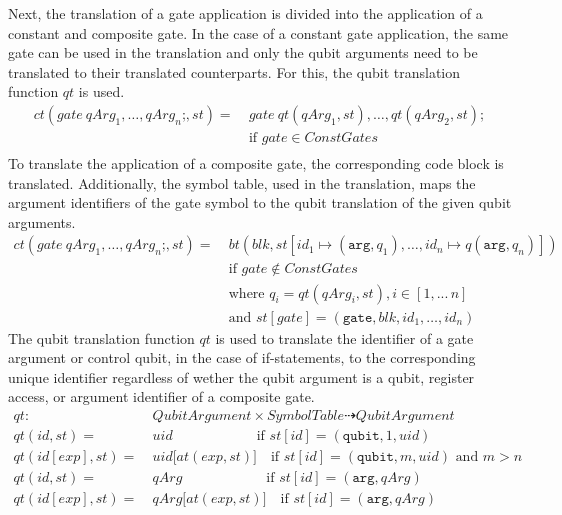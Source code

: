 Next, the translation of a gate application is divided into the application of a constant and composite gate. In the case of a constant gate application, the same gate can be used in the translation and only the qubit arguments need to be translated to their translated counterparts. For this, the qubit translation function $qt$ is used. 
\begin{align*}
    ct(gate \ qArg_1, \dots, qArg_n\texttt{;}, st) = \ & gate \ qt(qArg_1, st), \dots, qt(qArg_2, st); \\
                                                       & \text{if } gate \in ConstGates\\
\end{align*}
To translate the application of a composite gate, the corresponding code block is translated. Additionally, the symbol table, used in the translation, maps the argument identifiers of the gate symbol to the qubit translation of the given qubit arguments.
\begin{align*}
    ct(gate \ qArg_1, \dots, qArg_n\texttt{;}, st) = \ & bt(blk, st[id_1 \mapsto (\texttt{arg}, q_1), \dots, id_n \mapsto q(\texttt{arg}, q_n)]) \\
        &\text{if } gate \not\in ConstGates\\
        &\text{where } q_i = qt(qArg_i, st), i \in [1, ...\, n]\\
        &\text{and } st[gate] = (\texttt{gate}, blk, id_1, \dots, id_n)
\end{align*}
The qubit translation function $qt$ is used to translate the identifier of a gate argument or control qubit, in the case of if-statements, to the corresponding unique identifier regardless of wether the qubit argument is a qubit, register access, or argument identifier of a composite gate. 
\begin{align*}
    qt :\ & \displaystyle QubitArgument \times SymbolTable \dashrightarrow QubitArgument\\
    qt(id, st) = \ & uid \quad\quad\quad\quad\quad\quad \text{if } st[id] = (\texttt{qubit}, 1, uid)\\
    qt(id[exp], st) = \ & uid\texttt{[}at(exp, st)\texttt{]} \quad \text{if } st[id] = (\texttt{qubit}, m, uid) \text{ and } m > n\\
    qt(id, st) = \ & qArg \quad\quad\quad\quad\quad\quad \text{if } st[id] = (\texttt{arg}, qArg)\\
    qt(id[exp], st) = \ & qArg\texttt{[}at(exp, st)\texttt{]} \quad \text{if } st[id] = (\texttt{arg}, qArg)
\end{align*}


